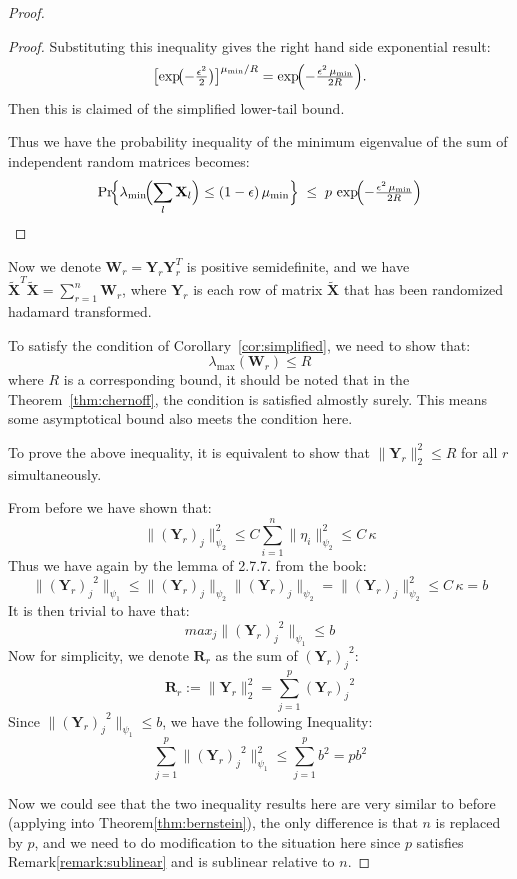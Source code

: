 \documentclass[11pt]{article}
\numberwithin{equation}{section}
\theoremstyle{plain}
\theoremstyle{definition}
\theoremstyle{remark}
\begin{document}
\begin{proof}
\begin{proof}
    Substituting this inequality gives the right hand side exponential result:
    \[
    \bigl[\exp\!\bigl(-\tfrac{\epsilon^{2}}{2}\bigr)\bigr]^{\mu_{\min}/R}
    =
    \exp\!\Bigl(-\tfrac{\epsilon^{2}\,\mu_{\min}}{2R}\Bigr).
    \]
    Then this is claimed of the simplified lower-tail bound.

Thus we have the probability inequality of the minimum eigenvalue of the sum of independent random matrices becomes:
\[
  \Pr\!\Bigl\{
      \lambda_{\min}\!\Bigl(\sum_l\mathbf X_l\Bigr)\le (1-\epsilon)\,\mu_{\min}
    \Bigr\}
  \;\le\;
  p\,\exp\!\Bigl(-\tfrac{\epsilon^{2}\,\mu_{\min}}{2R}\Bigr)
\]
\end{proof}

Now we denote $\mathbf{W}_r = \mathbf{Y}_r\mathbf{Y}_r^T$ is positive semidefinite, and we have $\tilde{\mathbf{X}}^T\tilde{\mathbf{X}} = \sum_{r=1}^n \mathbf{W}_r$, where $\mathbf{Y}_r$ is each row of matrix $\mathbf{\tilde{X}}$ that has been randomized hadamard transformed.

To satisfy the condition of Corollary~\ref{cor:simplified}, we need to show that:
\[
\lambda_{\max}(\mathbf{W}_r) \le R
\]
where $R$ is a corresponding bound, it should be noted that in the Theorem~\ref{thm:chernoff}, the condition is satisfied almostly surely. This means some asymptotical bound also meets the condition here.

To prove the above inequality, it is equivalent to show that $\|\mathbf{Y}_r\|_2^{2} \le R$ for all $r$ simultaneously.

From before we have shown that:
\[
    \|(\mathbf{Y}_{r})_{j}\|_{\psi_{2}}^{2}
       \le C \sum_{i=1}^{n}\|\eta_{i}\|_{\psi_{2}}^{2}
       \le C\,\kappa
  \]
Thus we have again by the lemma of 2.7.7. from the book\cite{vershynin2018high}:
\[
  \|{(\mathbf{Y}_{r})_{j}}^{2}\|_{\psi_{1}} \le \|(\mathbf{Y}_{r})_{j}\|_{\psi_{2}}\|(\mathbf{Y}_{r})_{j}\|_{\psi_{2}} = \|(\mathbf{Y}_{r})_{j}\|_{\psi_{2}}^{2} \le C\,\kappa = b
  \] 
It is then trivial to have that:
\[
max_j \|{(\mathbf{Y}_{r})_{j}}^{2}\|_{\psi_{1}} \le b
\]
Now for simplicity, we denote $\mathbf{R}_r$ as the sum of ${(\mathbf{Y}_{r})_{j}}^{2}$:
\[
\mathbf{R}_r := \|\mathbf{Y}_r\|_2^2 = \sum_{j=1}^p {(\mathbf{Y}_{r})_{j}}^2
\]
Since $\|{(\mathbf{Y}_{r})_{j}}^{2}\|_{\psi_{1}} \le b$, we have the following Inequality:
\[
  \sum_{j=1}^p \|{(\mathbf{Y}_{r})_{j}}^{2}\|_{\psi_{1}}^{2} \le \sum_{j=1}^p b^{2} = pb^{2}
\]

Now we could see that the two inequality results here are very similar to before (applying into Theorem\ref{thm:bernstein}), the only difference is that $n$ is replaced by $p$, and we need to do modification to the situation here since $p$ satisfies Remark\ref{remark:sublinear} and is sublinear relative to $n$.


\end{proof}
\end{document}
